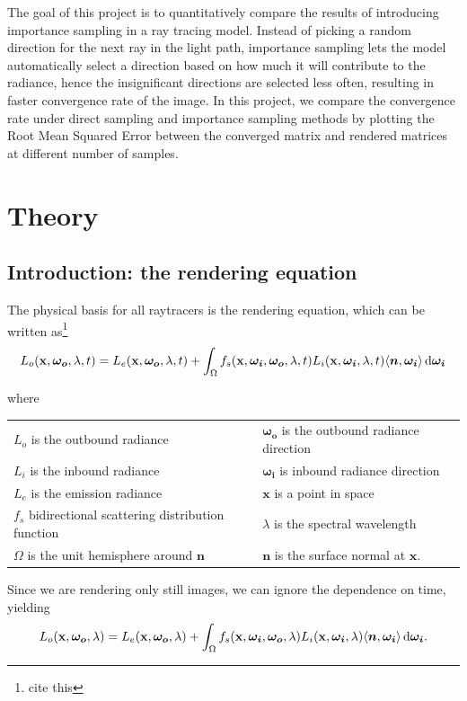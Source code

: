 \documentclass[12pt]{article}
\DeclarePairedDelimiter\ip{\langle }{\rangle}
\begin{document}
\noindent The goal of this project is to quantitatively compare the results of introducing importance sampling in a ray tracing model. Instead of picking a random direction for the next ray in the light path, importance sampling lets the model  automatically select a direction based on how much it will contribute to the radiance, hence the insignificant directions are selected less often, resulting in faster convergence rate of the image. In this project, we compare the convergence rate under direct sampling and importance sampling methods by plotting the Root Mean Squared Error between the converged matrix and rendered matrices at different number of samples.
\newline
    
\section{Theory}
\subsection{Introduction: the rendering equation}
The physical basis for all raytracers is the rendering equation, which can be written as\footnote{cite this}
\[L_{o}(\mathbf x, \bm {\omega_{o}}, \lambda, t) = L_{e}(\mathbf x, \bm{\omega_o}, \lambda, t) + \int_\Omega f_s(\mathbf x, \bm{\omega_i}, \bm{\omega_o}, \lambda, t)L_i(\mathbf x, \bm{\omega_i}, \lambda, t)\ip{\bm n, \bm{\omega_i}} \dif \bm{\omega_i}\]

where
\begin{center}
  \begin{tabu}{ll}
    \(L_{o}\) is the outbound radiance & \(\bm{\omega_o}\) is the outbound radiance direction\\
    \(L_{i}\) is the inbound radiance & \(\bm{\omega_i}\) is inbound radiance direction\\
    \(L_{e}\) is the emission radiance & \(\mathbf x\) is a point in space\\
    \(f_s\) bidirectional scattering distribution function & \(\lambda\) is the spectral wavelength\\
    \(\Omega\) is the unit hemisphere around \(\bm n\) & \(\bm n\) is the surface normal at \(\mathbf x\).
  \end{tabu}
\end{center}
Since we are rendering only still images, we can ignore the dependence on time, yielding
\[L_{o}(\mathbf x, \bm {\omega_{o}}, \lambda) = L_{e}(\mathbf x, \bm{\omega_o}, \lambda) + \int_\Omega f_s(\mathbf x, \bm{\omega_i}, \bm{\omega_o}, \lambda)L_i(\mathbf x, \bm{\omega_i}, \lambda)\ip{\bm n, \bm{\omega_i}} \dif \bm{\omega_i}.\]
\end{document}
